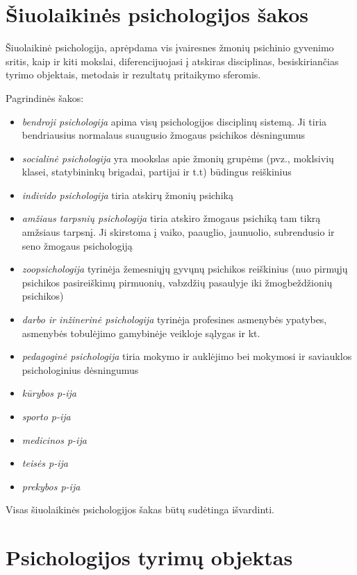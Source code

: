\section{Šiuolaikinės psichologijos šakos}

\label{tema:psichologijos_sakos}

Šiuolaikinė psichologija, aprėpdama vis įvairesnes žmonių psichinio gyvenimo
sritis, kaip ir kiti mokslai, diferencijuojasi į atskiras disciplinas, 
besiskiriančias tyrimo objektais, metodais ir rezultatų pritaikymo sferomis.

Pagrindinės šakos:
\begin{itemize}
  \item \emph{bendroji psichologija} apima visų psichologijos disciplinų 
  sistemą. Ji tiria bendriausius normalaus suaugusio žmogaus psichikos 
  dėsningumus
  \item \emph{socialinė psichologija} yra mookslas apie žmonių grupėms 
  (pvz., moklsivių klasei, statybininkų brigadai, partijai ir t.t)
  būdingus reiškinius
  \item \emph{individo psichologija} tiria atskirų žmonių psichiką
  \item \emph{amžiaus tarpsnių psichologija}  tiria atskiro žmogaus 
  psichiką tam tikrą amžsiaus tarpsnį. Ji skirstoma į vaiko, paauglio,
  jaunuolio, subrendusio ir seno žmogaus psichologiją
  \item \emph{zoopsichologija} tyrinėja žemesniųjų gyvųnų psichikos 
  reiškinius (nuo pirmųjų psichikos pasireiškimų pirmuonių, vabzdžių 
  pasaulyje iki žmogbeždžionių psichikos)
  \item \emph{darbo ir inžinerinė psichologija} tyrinėja profesines asmenybės
  ypatybes, asmenybės tobulėjimo gamybinėje veikloje sąlygas ir kt.
  \item \emph{pedagoginė psichologija} tiria mokymo ir auklėjimo bei 
  mokymosi ir saviauklos psichologinius dėsningumus
  \item \emph{kūrybos p-ija}
  \item \emph{sporto p-ija}
  \item \emph{medicinos p-ija}
  \item \emph{teisės p-ija}
  \item \emph{prekybos p-ija}
\end{itemize}
Visas šiuolaikinės psichologijos šakas būtų sudėtinga išvardinti.

\section{Psichologijos tyrimų objektas}

